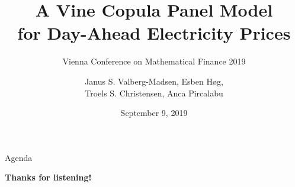 \documentclass[10pt]{beamer}
\title{A Vine Copula Panel Model\\for Day-Ahead Electricity Prices}
\subtitle{Vienna Conference on Mathematical Finance 2019}
\author{
  Janus S. Valberg-Madsen,
  Esben Høg,\\
  Troels S. Christensen,
  Anca Pircalabu
}
\date{September 9, 2019}
\begin{document}
{\aauwavesbg
  \begin{frame}
    \titlepage
  \end{frame}
}

\begin{frame}{Agenda}{}
  \tableofcontents
\end{frame}









{\aauwavesbg
  \begin{frame}
    \begin{center}
      \Huge{\textbf{Thanks for listening!}}
    \end{center}
  \end{frame}
}
\end{document}
